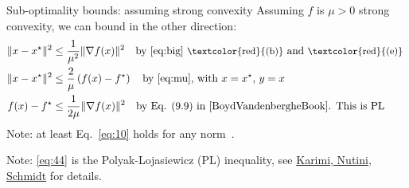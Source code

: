 \documentclass[10pt,handout]{beamer}
\begin{document}
\begin{frame}{Sub-optimality bounds: assuming strong convexity}
Assuming $f$ is $\mu>0$ strong convexity, we can bound in the other direction:
\begin{align}
    \|x-x^\star\|^2 &\le \frac{1}{\mu^2}\|\nabla f(x)\|^2 
    \quad \text{by \eqref{eq:big}  {\small\textcolor{red}{(b)}} and  {\small\textcolor{red}{(e)}} }
    \\
    \|x-x^\star\|^2 &\le \frac{2}{\mu}\left( f(x) - f^\star\right)
    \quad \text{by \eqref{eq:mu}, with $x=x^\star$, $y=x$} \label{eq:10} \\
    f(x) - f^\star &\le \frac{1}{2\mu}\|\nabla f(x)\|^2 \quad\text{by Eq. (9.9) in \cite{BoydVandenbergheBook}. This is PL}
    \label{eq:44}
\end{align}
Note: at least Eq.~\eqref{eq:10} holds for any norm~\cite[Thm. 5.25]{BeckBook}.

 Note: \eqref{eq:44} is the Polyak-Lojasiewicz (PL) inequality, see \href{https://arxiv.org/abs/1608.04636}{Karimi, Nutini, Schmidt} for details. 
 
 

\end{frame}
\end{document}
